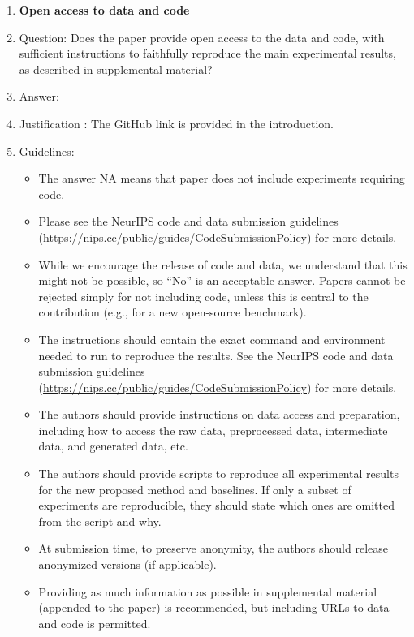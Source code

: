 \documentclass{article}
\begin{document}
\begin{enumerate}
\item {\bf Open access to data and code}
    \item[] Question: Does the paper provide open access to the data and code, with sufficient instructions to faithfully reproduce the main experimental results, as described in supplemental material?
    \item[] Answer: \answerYes{} %
    \item[] Justification : The GitHub link is provided in the introduction.
    \item[] Guidelines:
    \begin{itemize}
        \item The answer NA means that paper does not include experiments requiring code.
        \item Please see the NeurIPS code and data submission guidelines (\url{https://nips.cc/public/guides/CodeSubmissionPolicy}) for more details.
        \item While we encourage the release of code and data, we understand that this might not be possible, so “No” is an acceptable answer. Papers cannot be rejected simply for not including code, unless this is central to the contribution (e.g., for a new open-source benchmark).
        \item The instructions should contain the exact command and environment needed to run to reproduce the results. See the NeurIPS code and data submission guidelines (\url{https://nips.cc/public/guides/CodeSubmissionPolicy}) for more details.
        \item The authors should provide instructions on data access and preparation, including how to access the raw data, preprocessed data, intermediate data, and generated data, etc.
        \item The authors should provide scripts to reproduce all experimental results for the new proposed method and baselines. If only a subset of experiments are reproducible, they should state which ones are omitted from the script and why.
        \item At submission time, to preserve anonymity, the authors should release anonymized versions (if applicable).
        \item Providing as much information as possible in supplemental material (appended to the paper) is recommended, but including URLs to data and code is permitted.
    \end{itemize}



\end{enumerate}
\end{document}
